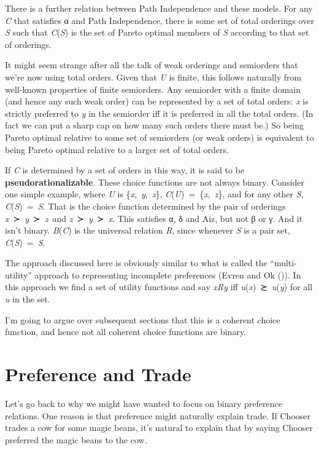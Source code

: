 \documentclass[
  11pt,
  letterpaper,
  DIV=11,
  numbers=noendperiod,
  twoside]{scrartcl}
\begin{document}
There is a further relation between Path Independence and these models.
For any \emph{C} that satisfies α and Path Independence, there is some
set of total orderings over \emph{S} such that \emph{C}(\emph{S}) is the
set of Pareto optimal members of \emph{S} according to that set of
orderings.

It might seem strange after all the talk of weak orderings and
semiorders that we're now using total orders. Given that \emph{U} is
finite, this follows naturally from well-known properties of finite
semiorders. Any semiorder with a finite domain (and hence any such weak
order) can be represented by a set of total orders: \emph{x} is strictly
preferred to \emph{y} in the semiorder iff it is preferred in all the
total orders. (In fact we can put a sharp cap on how many such orders
there must be.) So being Pareto optimal relative to some set of
semiorders (or weak orders) is equivalent to being Pareto optimal
relative to a larger set of total orders.

If \emph{C} is determined by a set of orders in this way, it is said to
be \textbf{pseudorationalizable}. These choice functions are not always
binary. Consider one simple example, where \emph{U} is
\{\emph{x},~\emph{y},~\emph{z}\},
\emph{C}(\emph{U})~=~\{\emph{x},~\emph{z}\}, and for any other \emph{S},
\emph{C}(\emph{S})~=~\emph{S}. That is the choice function determined by
the pair of orderings \emph{x}~≻~\emph{y}~≻~\emph{z}~and
\emph{z}~≻~\emph{y}~≻~\emph{x}. This satisfies α, δ and Aiz, but not β
or γ. And it isn't binary. \emph{B}(\emph{C}) is the universal relation
\emph{R}, since whenever \emph{S} is a pair set,
\emph{C}(\emph{S})~=~\emph{S}.

The approach discussed here is obviously similar to what is called the
``multi-utility'' approach to representing incomplete preferences (Evren
and Ok ()). In this approach we find a
set of utility functions and say \emph{xRy} iff
\emph{u}(\emph{x})~≿~\emph{u}(\emph{y}) for all \emph{u} in the set.

I'm going to argue over subsequent sections that this is a coherent
choice function, and hence not all coherent choice functions are binary.

\section{Preference and Trade}\label{sec-trade}

Let's go back to why we might have wanted to focus on binary preference
relations. One reason is that preference might naturally explain trade.
If Chooser trades a cow for some magic beans, it's natural to explain
that by saying Chooser preferred the magic beans to the cow.
\end{document}
